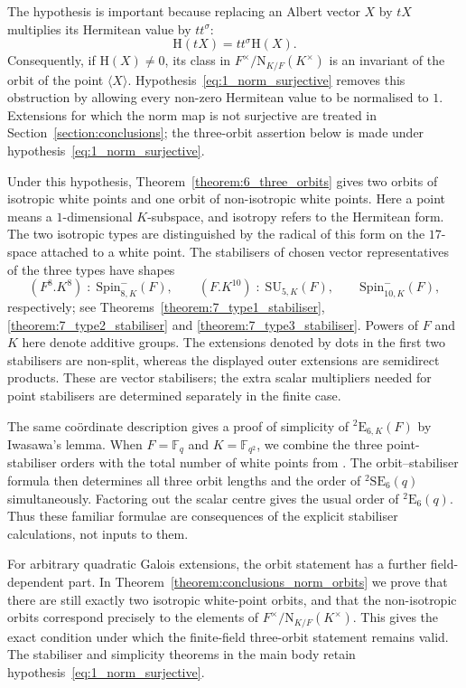 \documentclass{amsart}
\def\cn{\mathord{{\;\!{:}\;\!}}}
\def\NN{\mathord{\mathrm{N}}}
\newcommand{\Fq}{\mathbb{F}_q}
\newcommand{\Fqs}{\mathbb{F}_{q^2}}
\newcommand{\SU}{\mathrm{SU}}
\newcommand{\SE}{\mathrm{SE}}
\newcommand{\E}{\mathrm{E}}
\newcommand{\Spin}{\mathrm{Spin}}
\renewcommand{\H}{\mathrm{H}}
\newcommand{\s}{\sigma}
\theoremstyle{plain}
\numberwithin{theorem}{section}
\theoremstyle{definition}
\begin{document}
The hypothesis is important because replacing an Albert vector $X$ by $tX$
multiplies its Hermitean value by $tt^{\s}$:
\[
\H(tX)=tt^{\s}\H(X).
\]
Consequently, if $\H(X)\neq0$, its class in
$F^{\times}/\NN_{K/F}(K^{\times})$ is an invariant of the orbit of the point
$\langle X\rangle$. Hypothesis~\eqref{eq:1_norm_surjective} removes this
obstruction by allowing every non-zero Hermitean value to be normalised to $1$.
Extensions for which the norm map is not surjective are treated in
Section~\ref{section:conclusions};
the three-orbit assertion below is made under hypothesis~\eqref{eq:1_norm_surjective}.

Under this hypothesis, Theorem~\ref{theorem:6_three_orbits} gives two
orbits of isotropic white points and one orbit of non-isotropic white
points. Here a point means a $1$-dimensional $K$-subspace, and isotropy
refers to the Hermitean form. The two isotropic types are distinguished
by the radical of this form on the $17$-space attached to a white
point. The stabilisers of chosen vector representatives of the three
types have shapes
\[
    (F^8.K^8)\cn\Spin_{8,K}^{-}(F),\qquad
    (F.K^{10})\cn\SU_{5,K}(F),\qquad
    \Spin_{10,K}^{-}(F),
\]
respectively; see Theorems~\ref{theorem:7_type1_stabiliser},
\ref{theorem:7_type2_stabiliser} and
\ref{theorem:7_type3_stabiliser}. Powers of $F$ and $K$ here denote
additive groups. The extensions denoted by dots in the first two
stabilisers are non-split, whereas the displayed outer extensions are
semidirect products. These are vector stabilisers; the extra scalar
multipliers needed for point stabilisers are determined separately
in the finite case.

The same co\"ordinate description gives a proof of simplicity of
${}^2\E_{6,K}(F)$ by Iwasawa's lemma. When $F=\Fq$ and $K=\Fqs$,
we combine the three point-stabiliser orders with the total number
of white points from \cite{BSW1}. The orbit--stabiliser formula then
determines all three orbit lengths and the order of ${}^2\SE_6(q)$
simultaneously. Factoring out the scalar centre gives the usual order
of ${}^2\E_6(q)$. Thus these familiar formulae are consequences of the
explicit stabiliser calculations, not inputs to them.

For arbitrary quadratic Galois extensions, the orbit statement has
a further field-dependent part. In
Theorem~\ref{theorem:conclusions_norm_orbits} we prove that there are
still exactly two isotropic white-point orbits, and that the
non-isotropic orbits correspond precisely to the elements of
$F^{\times}/\NN_{K/F}(K^{\times})$. This gives the exact condition
under which the finite-field three-orbit statement remains valid.
The stabiliser and simplicity theorems in the main body
retain hypothesis~\eqref{eq:1_norm_surjective}.
\end{document}
